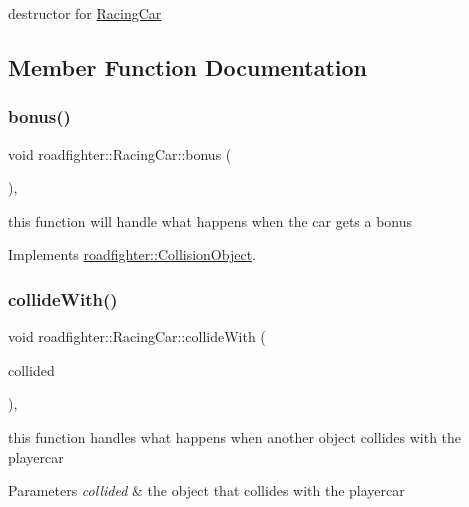 destructor for \hyperlink{classroadfighter_1_1RacingCar}{Racing\+Car} 

\subsection{Member Function Documentation}
\mbox{\label{classroadfighter_1_1RacingCar_a5858dd3f2c7bb49782b29c0a90846a6c}} 
\subsubsection{\texorpdfstring{bonus()}{bonus()}}
{\footnotesize\ttfamily void roadfighter\+::\+Racing\+Car\+::bonus (\begin{DoxyParamCaption}{ }\end{DoxyParamCaption})\hspace{0.3cm}{\ttfamily [override]}, {\ttfamily [virtual]}}

this function will handle what happens when the car gets a bonus 

Implements \hyperlink{classroadfighter_1_1CollisionObject_a157e499c27619ceefd6179a459fafd90}{roadfighter\+::\+Collision\+Object}.

\mbox{\label{classroadfighter_1_1RacingCar_a1de00cf7c8df548e8ab57a27cefb7345}} 
\subsubsection{\texorpdfstring{collide\+With()}{collideWith()}}
{\footnotesize\ttfamily void roadfighter\+::\+Racing\+Car\+::collide\+With (\begin{DoxyParamCaption}\item[{std\+::shared\+\_\+ptr$<$ \hyperlink{classroadfighter_1_1CollisionObject}{Collision\+Object} $>$ \&}]{collided }\end{DoxyParamCaption})\hspace{0.3cm}{\ttfamily [override]}, {\ttfamily [virtual]}}

this function handles what happens when another object collides with the playercar 
\begin{DoxyParams}{Parameters}
{\em collided} & the object that collides with the playercar \\
\hline
\end{DoxyParams}


